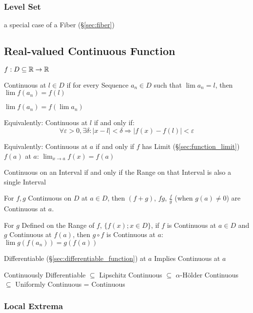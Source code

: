 \subsubsection{Level Set}\label{sec:level_set}

a special case of a Fiber (\S\ref{sec:fiber})



\subsection{Real-valued Continuous Function}\label{sec:real_continuous}

$f : D \subseteq \mathbb{R} \rightarrow \mathbb{R}$

Continuous at $l \in D$ if for every Sequence $a_n \in D$ such that
$\lim a_n = l$, then $\lim f(a_n) = f(l)$

$\lim f (a_n) = f (\lim a_n)$

Equivalently: Continuous at $l$ if and only if:
\[
  \forall \varepsilon > 0, \exists \delta :
  |x - l| < \delta \Rightarrow |f(x) - f(l)| < \varepsilon
\]

Equivalently: Continuous at $a$ if and only if $f$ has Limit
(\S\ref{sec:function_limit}) $f(a)$ at $a$: $\lim_{x \rightarrow
  a}f(x) = f(a)$

Continuous on an Interval if and only if the Range on that Interval is
also a single Interval

For $f,g$ Continuous on $D$ at $a \in D$, then $(f + g)$, $f g$,
$\frac{f}{g}$ (when $g(a) \neq 0$) are Continuous at $a$.

For $g$ Defined on the Range of $f$, $\{ f(x); x \in D\}$, if $f$ is
Continuous at $a \in D$ and $g$ Continuous at $f(a)$, then $g \circ f$
is Continuous at $a$: $\lim g(f(a_n)) = g(f(a))$

Differentiable (\S\ref{sec:differentiable_function}) at $a$ Implies
Continuous at $a$

Continuously Differentiable $\subseteq$ Lipschitz Continuous $\subseteq$
$\alpha$-H\"older Continuous $\subseteq$ Uniformly Continuous = Continuous



\subsubsection{Local Extrema}\label{sec:local_extrema}

